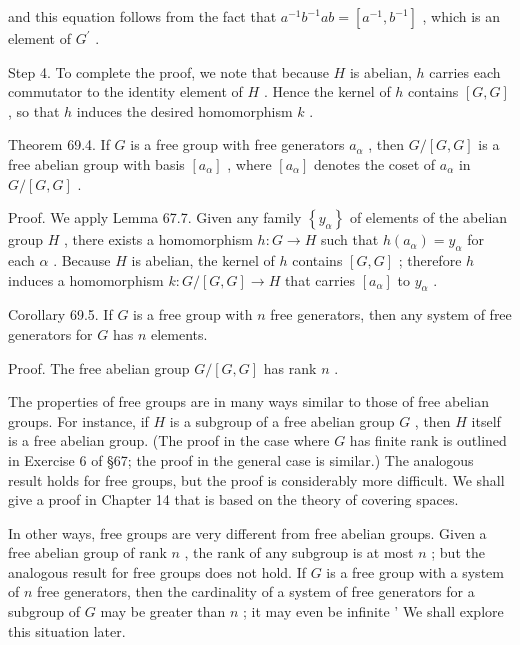 \documentclass[10pt]{article}
\begin{document}
and this equation follows from the fact that \({a}^{-1}{b}^{-1}{ab} = \left\lbrack  {{a}^{-1},{b}^{-1}}\right\rbrack\) , which is an element of \({G}^{\prime }\) .

Step 4. To complete the proof, we note that because \(H\) is abelian, \(h\) carries each commutator to the identity element of \(H\) . Hence the kernel of \(h\) contains \(\left\lbrack  {G,G}\right\rbrack\) , so that \(h\) induces the desired homomorphism \(k\) .

Theorem 69.4. If \(G\) is a free group with free generators \({a}_{\alpha }\) , then \(G/\left\lbrack  {G,G}\right\rbrack\) is a free abelian group with basis \(\left\lbrack  {a}_{\alpha }\right\rbrack\) , where \(\left\lbrack  {a}_{\alpha }\right\rbrack\) denotes the coset of \({a}_{\alpha }\) in \(G/\left\lbrack  {G,G}\right\rbrack\) .

Proof. We apply Lemma 67.7. Given any family \(\left\{  {y}_{\alpha }\right\}\) of elements of the abelian group \(H\) , there exists a homomorphism \(h : G \rightarrow  H\) such that \(h\left( {a}_{\alpha }\right)  = {y}_{\alpha }\) for each \(\alpha\) . Because \(H\) is abelian, the kernel of \(h\) contains \(\left\lbrack  {G,G}\right\rbrack\) ; therefore \(h\) induces a homomorphism \(k : G/\left\lbrack  {G,G}\right\rbrack   \rightarrow  H\) that carries \(\left\lbrack  {a}_{\alpha }\right\rbrack\) to \({y}_{\alpha }\) .

Corollary 69.5. If \(G\) is a free group with \(n\) free generators, then any system of free generators for \(G\) has \(n\) elements.

Proof. The free abelian group \(G/\left\lbrack  {G,G}\right\rbrack\) has rank \(n\) .

The properties of free groups are in many ways similar to those of free abelian groups. For instance, if \(H\) is a subgroup of a free abelian group \(G\) , then \(H\) itself is a free abelian group. (The proof in the case where \(G\) has finite rank is outlined in Exercise 6 of §67; the proof in the general case is similar.) The analogous result holds for free groups, but the proof is considerably more difficult. We shall give a proof in Chapter 14 that is based on the theory of covering spaces.

In other ways, free groups are very different from free abelian groups. Given a free abelian group of rank \(n\) , the rank of any subgroup is at most \(n\) ; but the analogous result for free groups does not hold. If \(G\) is a free group with a system of \(n\) free generators, then the cardinality of a system of free generators for a subgroup of \(G\) may be greater than \(n\) ; it may even be infinite ’ We shall explore this situation later.
\end{document}
